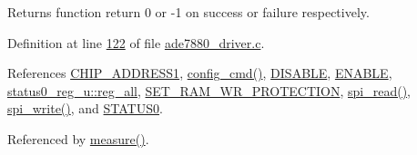 \begin{DoxyReturn}{Returns}
function return 0 or -\/1 on success or failure respectively. 

 
\end{DoxyReturn}


Definition at line \hyperlink{a00034_source_l00122}{122} of file \hyperlink{a00034_source}{ade7880\-\_\-driver.\-c}.



References \hyperlink{a00036_source_l00039}{C\-H\-I\-P\-\_\-\-A\-D\-D\-R\-E\-S\-S1}, \hyperlink{a00004_ga369ee0e8379941cbc2c79b90ec3292da}{config\-\_\-cmd()}, \hyperlink{a00036_source_l00041}{D\-I\-S\-A\-B\-L\-E}, \hyperlink{a00036_source_l00040}{E\-N\-A\-B\-L\-E}, \hyperlink{a00035_source_l00219}{status0\-\_\-reg\-\_\-u\-::reg\-\_\-all}, \hyperlink{a00042_source_l00016}{S\-E\-T\-\_\-\-R\-A\-M\-\_\-\-W\-R\-\_\-\-P\-R\-O\-T\-E\-C\-T\-I\-O\-N}, \hyperlink{a00039_source_l00147}{spi\-\_\-read()}, \hyperlink{a00039_source_l00221}{spi\-\_\-write()}, and \hyperlink{a00035_source_l00216}{S\-T\-A\-T\-U\-S0}.



Referenced by \hyperlink{a00041_source_l00040}{measure()}.


